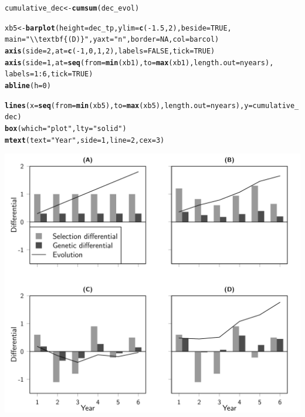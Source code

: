 \documentclass{article}\usepackage[]{graphicx}\usepackage[]{color}
\makeatletter
\def\maxwidth{ %
  \ifdim\Gin@nat@width>\linewidth
    \linewidth
  \else
    \Gin@nat@width
  \fi
}
\newcommand{\hlnum}[1]{\textcolor[rgb]{0.686,0.059,0.569}{#1}}%
\newcommand{\hlstr}[1]{\textcolor[rgb]{0.192,0.494,0.8}{#1}}%
\newcommand{\hlopt}[1]{\textcolor[rgb]{0,0,0}{#1}}%
\newcommand{\hlstd}[1]{\textcolor[rgb]{0.345,0.345,0.345}{#1}}%
\newcommand{\hlkwb}[1]{\textcolor[rgb]{0.69,0.353,0.396}{#1}}%
\newcommand{\hlkwc}[1]{\textcolor[rgb]{0.333,0.667,0.333}{#1}}%
\newcommand{\hlkwd}[1]{\textcolor[rgb]{0.737,0.353,0.396}{\textbf{#1}}}%
\newenvironment{kframe}{%
 \def\at@end@of@kframe{}%
 \ifinner\ifhmode%
  \def\at@end@of@kframe{\end{minipage}}%
  \begin{minipage}{\columnwidth}%
 \fi\fi%
 \def\FrameCommand##1{\hskip\@totalleftmargin \hskip-\fboxsep
 \colorbox{shadecolor}{##1}\hskip-\fboxsep
     \hskip-\linewidth \hskip-\@totalleftmargin \hskip\columnwidth}%
 \MakeFramed {\advance\hsize-\width
   \@totalleftmargin\z@ \linewidth\hsize
   \@setminipage}}%
 {\par\unskip\endMakeFramed%
 \at@end@of@kframe}
\newenvironment{knitrout}{}{} %
\makeatother
\begin{document}
\begin{knitrout}
\begin{kframe}
\begin{alltt}
\hlstd{cumulative_dec} \hlkwb{<-} \hlkwd{cumsum}\hlstd{(dec_evol)}

\hlstd{xb5} \hlkwb{<-} \hlkwd{barplot}\hlstd{(}\hlkwc{height} \hlstd{= dec_tp,} \hlkwc{ylim} \hlstd{=} \hlkwd{c}\hlstd{(}\hlopt{-}\hlnum{1.5}\hlstd{,}\hlnum{2}\hlstd{),} \hlkwc{beside} \hlstd{=} \hlnum{TRUE}\hlstd{,}
               \hlkwc{main}\hlstd{=}\hlstr{"\textbackslash{}\textbackslash{}textbf\{(D)\}"}\hlstd{,} \hlkwc{yaxt}\hlstd{=}\hlstr{"n"}\hlstd{,} \hlkwc{border} \hlstd{=} \hlnum{NA}\hlstd{,} \hlkwc{col} \hlstd{= barcol )}
\hlkwd{axis}\hlstd{(}\hlkwc{side}\hlstd{=}\hlnum{2}\hlstd{,} \hlkwc{at} \hlstd{=} \hlkwd{c}\hlstd{(}\hlopt{-}\hlnum{1}\hlstd{,}\hlnum{0}\hlstd{,}\hlnum{1}\hlstd{,}\hlnum{2}\hlstd{),} \hlkwc{labels} \hlstd{=} \hlnum{FALSE}\hlstd{,} \hlkwc{tick} \hlstd{=} \hlnum{TRUE}\hlstd{)}
\hlkwd{axis}\hlstd{(}\hlkwc{side}\hlstd{=}\hlnum{1}\hlstd{,} \hlkwc{at} \hlstd{=} \hlkwd{seq}\hlstd{(}\hlkwc{from}\hlstd{=}\hlkwd{min}\hlstd{(xb1),} \hlkwc{to}\hlstd{=}\hlkwd{max}\hlstd{(xb1),} \hlkwc{length.out} \hlstd{= nyears),}
     \hlkwc{labels} \hlstd{=} \hlnum{1}\hlopt{:}\hlnum{6}\hlstd{,}\hlkwc{tick} \hlstd{=} \hlnum{TRUE}\hlstd{)}
\hlkwd{abline}\hlstd{(}\hlkwc{h}\hlstd{=}\hlnum{0}\hlstd{)}

\hlkwd{lines}\hlstd{(}\hlkwc{x}\hlstd{=}\hlkwd{seq}\hlstd{(}\hlkwc{from}\hlstd{=}\hlkwd{min}\hlstd{(xb5),} \hlkwc{to}\hlstd{=}\hlkwd{max}\hlstd{(xb5),} \hlkwc{length.out} \hlstd{= nyears),} \hlkwc{y}\hlstd{=cumulative_dec)}
\hlkwd{box}\hlstd{(}\hlkwc{which} \hlstd{=} \hlstr{"plot"}\hlstd{,} \hlkwc{lty} \hlstd{=} \hlstr{"solid"}\hlstd{)}
\hlkwd{mtext}\hlstd{(}\hlkwc{text} \hlstd{=} \hlstr{"Year"}\hlstd{,} \hlkwc{side} \hlstd{=} \hlnum{1}\hlstd{,} \hlkwc{line} \hlstd{=} \hlnum{2}\hlstd{,}\hlkwc{cex} \hlstd{=} \hlnum{3}\hlstd{)}
\end{alltt}
\end{kframe}
\includegraphics[width=\maxwidth]{figure/concetpualplot-1} 

\end{knitrout}
\end{document}
